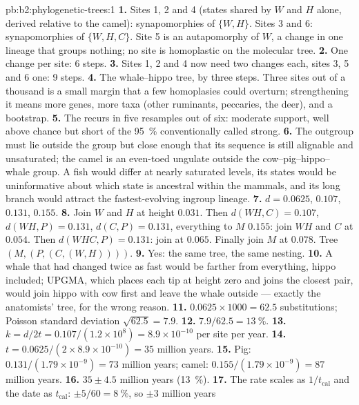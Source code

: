 \begin{solution}{pb:b2:phylogenetic-trees:1}
\textbf{1.} Sites 1, 2 and 4 (states shared by $W$ and $H$ alone,
derived relative to the camel): synapomorphies of $\{W,H\}$. Sites 3
and 6: synapomorphies of $\{W,H,C\}$. Site 5 is an autapomorphy of
$W$, a change in one lineage that groups nothing; no site is
homoplastic on the molecular tree.
\textbf{2.} One change per site: 6 steps.
\textbf{3.} Sites 1, 2 and 4 now need two changes each, sites 3, 5
and 6 one: 9 steps.
\textbf{4.} The whale--hippo tree, by three steps. Three sites out
of a thousand is a small margin that a few homoplasies could
overturn; strengthening it means more genes, more taxa (other
ruminants, peccaries, the deer), and a bootstrap.
\textbf{5.} The  recurs in five resamples out of six: moderate
support, well above chance but short of the \qty{95}{\%}
conventionally called strong.
\textbf{6.} The outgroup must lie outside the group but close enough
that its sequence is still alignable and unsaturated; the camel is
an even-toed ungulate outside the cow--pig--hippo--whale group. A
fish would differ at nearly saturated levels, its states would be
uninformative about which state is ancestral within the mammals,
and its long branch would attract the fastest-evolving ingroup
lineage.
\textbf{7.} $d = 0.0625$, $0.107$, $0.131$, $0.155$.
\textbf{8.} Join $W$ and $H$ at height $0.031$. Then $d(WH,C) =
0.107$, $d(WH,P) = 0.131$, $d(C,P) = 0.131$, everything to $M$
$0.155$: join $WH$ and $C$ at $0.054$. Then $d(WHC,P) = 0.131$: join
at $0.065$. Finally join $M$ at $0.078$. Tree $(M,(P,(C,(W,H))))$.
\textbf{9.} Yes: the same tree, the same nesting.
\textbf{10.} A whale that had changed twice as fast would be
farther from everything, hippo included; UPGMA, which places each
tip at height zero and joins the closest pair, would join hippo
with cow first and leave the whale outside --- exactly the
anatomists' tree, for the wrong reason.
\textbf{11.} $0.0625\times 1000 = 62.5$ substitutions; Poisson
standard deviation $\sqrt{62.5} = 7.9$.
\textbf{12.} $7.9/62.5 = \qty{13}{\%}$.
\textbf{13.} $k = d/2t = 0.107/(1.2\times 10^{8}) = 8.9\times 10^{-10}$
per site per year.
\textbf{14.} $t = 0.0625/(2\times 8.9\times 10^{-10}) = 35$ million
years.
\textbf{15.} Pig: $0.131/(1.79\times 10^{-9}) = 73$ million years;
camel: $0.155/(1.79\times 10^{-9}) = 87$ million years.
\textbf{16.} $35 \pm 4.5$ million years (\qty{13}{\%}).
\textbf{17.} The rate scales as $1/t_{\text{cal}}$ and the date as
$t_{\text{cal}}$: $\pm 5/60 = \qty{8}{\%}$, so $\pm 3$ million years

\end{solution}

